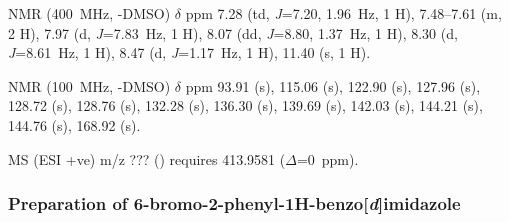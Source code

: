  NMR (400~MHz, -DMSO) $\delta$ ppm
7.28 (td, \emph{J}=7.20, 1.96~Hz, 1 H),
7.48--7.61 (m, 2 H),
7.97 (d, \emph{J}=7.83~Hz, 1 H),
8.07 (dd, \emph{J}=8.80, 1.37~Hz, 1 H),
8.30 (d, \emph{J}=8.61~Hz, 1 H),
8.47 (d, \emph{J}=1.17~Hz, 1 H),
11.40 (s, 1 H).

 NMR (100~MHz, -DMSO) $\delta$ ppm
93.91 (s),
115.06 (s),
122.90 (s),
127.96 (s),
128.72 (s),
128.76 (s),
132.28 (s),
136.30 (s),
139.69 (s),
142.03 (s),
144.21 (s),
144.76 (s),
168.92 (s).

MS (ESI +ve) m/z ??? ()  requires 413.9581 ($\Delta$=0~ppm).

\normalsize

\subsubsection{Preparation of 6-bromo-2-phenyl-1\textbf{H}-benzo[\emph{d}]imidazole}